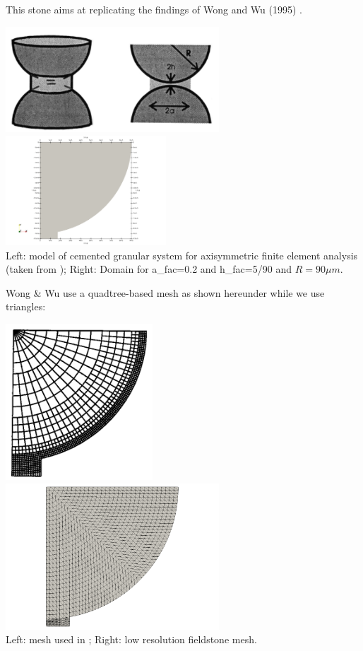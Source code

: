 This stone aims at replicating the findings of Wong and Wu (1995) \cite{wowu95}.

\begin{center}
\includegraphics[width=8cm]{python_codes/fieldstone_63/images/yoyo}
\includegraphics[width=6cm]{python_codes/fieldstone_63/images/domain}\\
{\captionfont Left: model of cemented granular system for 
axisymmetric finite element analysis (taken from \cite{wowu95}); Right: 
Domain for a\_fac=0.2 and h\_fac=5/90 and $R=90\mu m$.}
\end{center}

Wong \& Wu use a quadtree-based mesh as shown hereunder while we 
use triangles:

\begin{center}
\includegraphics[width=5.5cm]{python_codes/fieldstone_63/images/wowu95b}
\includegraphics[width=8cm]{python_codes/fieldstone_63/images/mesh}\\
{\captionfont Left: mesh used in \cite{wowu95}; 
Right: low resolution fieldstone mesh.}
\end{center}


